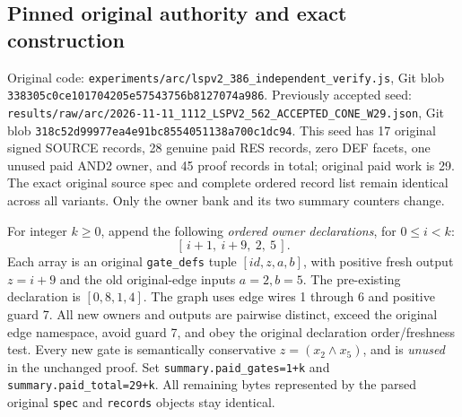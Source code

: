 \documentclass[11pt]{article}
\begin{document}
\subsection*{Pinned original authority and exact construction}
Original code: \texttt{experiments/arc/lspv2\_386\_independent\_verify.js}, Git blob
\texttt{338305c0ce101704205e57543756b8127074a986}.
Previously accepted seed: \texttt{results/raw/arc/2026-11-11\_1112\_LSPV2\_562\_ACCEPTED\_CONE\_W29.json},
Git blob \texttt{318c52d99977ea4e91bc8554051138a700c1dc94}.
This seed has 17 original signed SOURCE records, 28 genuine paid RES records, zero DEF facets, one unused paid AND2 owner, and 45 proof records in total; original paid work is 29. The exact original source spec and complete ordered record list remain identical across all variants. Only the owner bank and its two summary counters change.

For integer \(k\geq 0\), append the following \emph{ordered owner declarations}, for \(0\leq i<k\):
\[
 [\,i+1,\ i+9,\ 2,\ 5\,].
\]
Each array is an original \texttt{gate\_defs} tuple \([id,z,a,b]\), with positive fresh output \(z=i+9\) and the old original-edge inputs \(a=2,b=5\). The pre-existing declaration is \([0,8,1,4]\). The graph uses edge wires 1 through 6 and positive guard 7. All new owners and outputs are pairwise distinct, exceed the original edge namespace, avoid guard 7, and obey the original declaration order/freshness test. Every new gate is semantically conservative \(z=(x_2\wedge x_5)\), and is \emph{unused} in the unchanged proof. Set \texttt{summary.paid\_gates=1+k} and \texttt{summary.paid\_total=29+k}. All remaining bytes represented by the parsed original \texttt{spec} and \texttt{records} objects stay identical.
\end{document}
